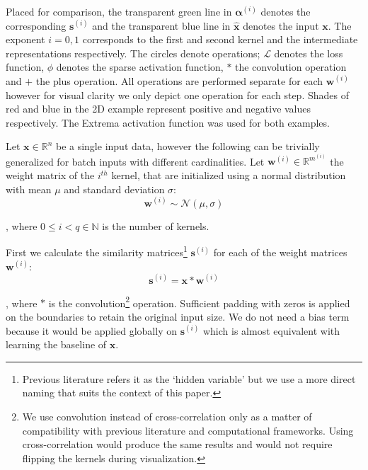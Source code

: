 \documentclass[journal]{IEEEtran}
\begin{document}
\begin{figure*}[!t]
{	Placed for comparison, the transparent green line in $\bm{\alpha}^{(i)}$ denotes the corresponding $\bm{s}^{(i)}$ and the transparent blue line in $\hat{\bm{x}}$ denotes the input $\bm{x}$.
	The exponent $i=0,1$ corresponds to the first and second kernel and the intermediate representations respectively.
	The circles denote operations; $\mathcal{L}$ denotes the loss function, $\phi$ denotes the sparse activation function, $\ast$ the convolution operation and $+$ the plus operation.
	All operations are performed separate for each $\bm{w}^{(i)}$ however for visual clarity we only depict one operation for each step.
	Shades of red and blue in the 2D example represent positive and negative values respectively.
	The Extrema activation function was used for both examples.
	}\label{fig:sans}
\end{figure*}

Let $\bm{x} \in \mathbb{R}^n$ be a single input data, however the following can be trivially generalized for batch inputs with different cardinalities.
Let $\bm{w}^{(i)} \in \mathbb{R}^{m^{(i)}}$ the weight matrix of the $i^{th}$ kernel, that are initialized using a normal distribution with mean $\mu$ and standard deviation $\sigma$:
\begin{equation}
	\label{eq:weightinitialization}
	\bm{w}^{(i)} \sim \mathcal{N}(\mu, \sigma)
\end{equation}

\noindent
, where $0\le i < q \in \mathbb{N}$ is the number of kernels.

First we calculate the similarity matrices\footnote{Previous literature refers it as the `hidden variable' but we use a more direct naming that suits the context of this paper.} $\bm{s}^{(i)}$ for each of the weight matrices $\bm{w}^{(i)}$:
\begin{equation}
	\label{eq:similarity}
	\bm{s}^{(i)} = \bm{x} * \bm{w}^{(i)}
\end{equation}

\noindent
, where $*$ is the convolution\footnote{We use convolution instead of cross-correlation only as a matter of compatibility with previous literature and computational frameworks. Using cross-correlation would produce the same results and would not require flipping the kernels during visualization.} operation.
Sufficient padding with zeros is applied on the boundaries to retain the original input size.
We do not need a bias term because it would be applied globally on $\bm{s}^{(i)}$ which is almost equivalent with learning the baseline of $\bm{x}$.
\end{document}
